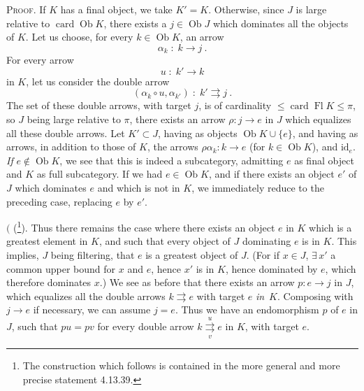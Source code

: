 \documentclass[11pt]{article}
\newcommand{\msp}[1]{\marginpar{\footnotesize [#1]}}
\newcommand{\Ob}{\operatorname{Ob}}
\newcommand{\Fl}{\operatorname{Fl}}
\newcommand{\card}{\operatorname{card}}
\newcommand{\id}{\mathrm{id}}
\begin{document}
\textsc{Proof}. If $K$ has a final object, we take $K' = K$. Otherwise, since $J$ is large relative to $\card \Ob K$, there exists a $j \in \Ob J$ which dominates all the objects of $K$. Let us choose, for every $k \in \Ob K$, an arrow
\[ \alpha_k \;:\; k \longrightarrow j \ . \]
For every arrow
\[ u \;:\; k' \longrightarrow k \]
in $K$, let us consider the double arrow
\[ (\alpha_k \circ u, \alpha_{k'}) \;:\; k' \rightrightarrows j \ . \]
The set of these double arrows, with target $j$, is of cardinality $\leqslant \card \Fl K \leqslant \pi$, so $J$ being large relative to $\pi$, there exists an arrow $\rho : j \longrightarrow e$ in $J$ which equalizes all these double arrows. Let $K' \subset J$, having as objects $\Ob K \cup \{e\}$, and having as arrows, in addition to
\msp{page 363}
those of $K$, the arrows $\rho\alpha_k : k \longrightarrow e$ (for $k \in \Ob K$), and $\id_e$. \textit{If} $e \notin \Ob K$, we see that this is indeed a subcategory, admitting $e$ as final object and $K$ as full subcategory. If we had $e \in \Ob K$, and if there exists an object $e'$ of $J$ which dominates $e$ and which is not in $K$, we immediately reduce to the preceding case, replacing $e$ by $e'$.

$\Biggl($ (\footnote[161]{The construction which follows is contained in the more general and more precise statement 4.13.39.}). Thus there remains the case where there exists an object $e$ in $K$ which is a greatest element in $K$, and such that every object of $J$ dominating $e$ is in $K$. This implies, $J$ being filtering, that $e$ is a greatest object of $J$. (For if $x \in J$, $\exists\, x'$ a common upper bound for $x$ and $e$, hence $x'$ is in $K$, hence dominated by $e$, which therefore dominates $x$.) We see as before that there exists an arrow $p : e \longrightarrow j$ in $J$, which equalizes all the double arrows $k \rightrightarrows e$ with target $e$ \textit{in}~$K$. Composing with $j \longrightarrow e$ if necessary, we can assume $j = e$. Thus we have an endomorphism $p$ of $e$ in $J$, such that $pu = pv$ for every double arrow $k \overset{u}{\underset{v}{\rightrightarrows}} e$ in $K$, with target $e$.

\msp{page 364}
\end{document}
